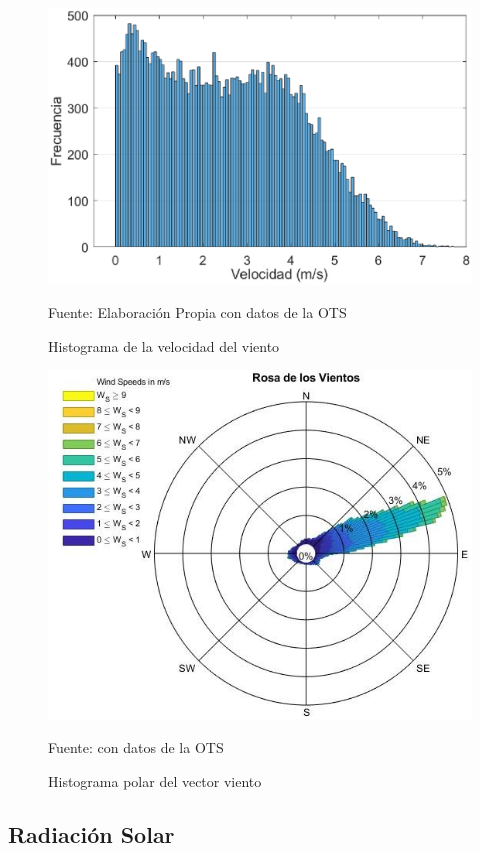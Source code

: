 \begin{figure}[H]
\centering
\includegraphics[scale=0.78]{Figuras/histograma_velocidad.eps}
\caption{Histograma de la velocidad del viento}
Fuente: Elaboración Propia con datos de la OTS
\label{histograma_velocidad}
\end{figure}

\begin{figure}[H]
\centering
\includegraphics[scale=0.72]{Figuras/Rosa_de_los_vientos.jpg}
\caption{Histograma polar del vector viento}
Fuente: \cite{windrose} con datos de la OTS
\label{rosa_de_los_vientos}
\end{figure}

\subsection{Radiación Solar}

